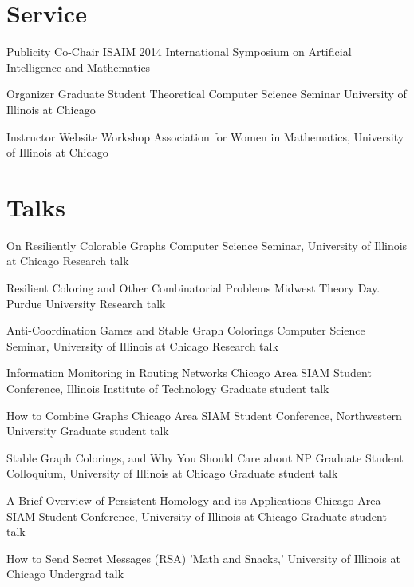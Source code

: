 \documentclass[11pt]{moderncv}
\begin{document}
   \section{Service}
         {Publicity Co-Chair}
      {ISAIM 2014}
      {International Symposium on Artificial Intelligence and Mathematics}
      {}
{}

         {Organizer}
      {Graduate Student Theoretical Computer Science Seminar}
      {University of Illinois at Chicago}
      {}
{}

         {Instructor}
      {Website Workshop}
      {Association for Women in Mathematics, University of Illinois at Chicago}
      {}
{}


   \section{Talks}
         {On Resiliently Colorable Graphs}
      {Computer Science Seminar, University of Illinois at Chicago}
      {Research talk}
      {}
{}

         {Resilient Coloring and Other Combinatorial Problems}
      {Midwest Theory Day. Purdue University}
      {Research talk}
      {}
{}

         {Anti-Coordination Games and Stable Graph Colorings}
      {Computer Science Seminar, University of Illinois at Chicago}
      {Research talk}
      {}
{}

         {Information Monitoring in Routing Networks}
      {Chicago Area SIAM Student Conference, Illinois Institute of Technology}
      {Graduate student talk}
      {}
{}

         {How to Combine Graphs}
      {Chicago Area SIAM Student Conference, Northwestern University}
      {Graduate student talk}
      {}
{}

         {Stable Graph Colorings, and Why You Should Care about NP}
      {Graduate Student Colloquium, University of Illinois at Chicago}
      {Graduate student talk}
      {}
{}

         {A Brief Overview of Persistent Homology and its Applications}
      {Chicago Area SIAM Student Conference, University of Illinois at Chicago}
      {Graduate student talk}
      {}
{}

         {How to Send Secret Messages (RSA)}
      {'Math and Snacks,' University of Illinois at Chicago}
      {Undergrad talk}
      {}
{}
\end{document}
